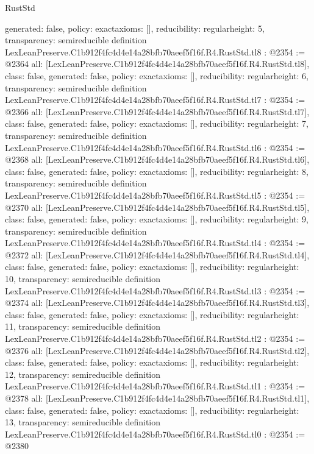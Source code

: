 \begin{lexlean}{RustStd}
\begin{coremodule}
{  generated: false,
  policy: exact{axioms: []},
  reducibility: regular{height: 5},
  transparency: semireducible
}
definition LexLeanPreserve.C1b912f4fc4d4e14a28bfb70aeef5f16f.R4.RustStd.tl8 : @2354 := @2364 {
  all: [LexLeanPreserve.C1b912f4fc4d4e14a28bfb70aeef5f16f.R4.RustStd.tl8],
  class: false,
  generated: false,
  policy: exact{axioms: []},
  reducibility: regular{height: 6},
  transparency: semireducible
}
definition LexLeanPreserve.C1b912f4fc4d4e14a28bfb70aeef5f16f.R4.RustStd.tl7 : @2354 := @2366 {
  all: [LexLeanPreserve.C1b912f4fc4d4e14a28bfb70aeef5f16f.R4.RustStd.tl7],
  class: false,
  generated: false,
  policy: exact{axioms: []},
  reducibility: regular{height: 7},
  transparency: semireducible
}
definition LexLeanPreserve.C1b912f4fc4d4e14a28bfb70aeef5f16f.R4.RustStd.tl6 : @2354 := @2368 {
  all: [LexLeanPreserve.C1b912f4fc4d4e14a28bfb70aeef5f16f.R4.RustStd.tl6],
  class: false,
  generated: false,
  policy: exact{axioms: []},
  reducibility: regular{height: 8},
  transparency: semireducible
}
definition LexLeanPreserve.C1b912f4fc4d4e14a28bfb70aeef5f16f.R4.RustStd.tl5 : @2354 := @2370 {
  all: [LexLeanPreserve.C1b912f4fc4d4e14a28bfb70aeef5f16f.R4.RustStd.tl5],
  class: false,
  generated: false,
  policy: exact{axioms: []},
  reducibility: regular{height: 9},
  transparency: semireducible
}
definition LexLeanPreserve.C1b912f4fc4d4e14a28bfb70aeef5f16f.R4.RustStd.tl4 : @2354 := @2372 {
  all: [LexLeanPreserve.C1b912f4fc4d4e14a28bfb70aeef5f16f.R4.RustStd.tl4],
  class: false,
  generated: false,
  policy: exact{axioms: []},
  reducibility: regular{height: 10},
  transparency: semireducible
}
definition LexLeanPreserve.C1b912f4fc4d4e14a28bfb70aeef5f16f.R4.RustStd.tl3 : @2354 := @2374 {
  all: [LexLeanPreserve.C1b912f4fc4d4e14a28bfb70aeef5f16f.R4.RustStd.tl3],
  class: false,
  generated: false,
  policy: exact{axioms: []},
  reducibility: regular{height: 11},
  transparency: semireducible
}
definition LexLeanPreserve.C1b912f4fc4d4e14a28bfb70aeef5f16f.R4.RustStd.tl2 : @2354 := @2376 {
  all: [LexLeanPreserve.C1b912f4fc4d4e14a28bfb70aeef5f16f.R4.RustStd.tl2],
  class: false,
  generated: false,
  policy: exact{axioms: []},
  reducibility: regular{height: 12},
  transparency: semireducible
}
definition LexLeanPreserve.C1b912f4fc4d4e14a28bfb70aeef5f16f.R4.RustStd.tl1 : @2354 := @2378 {
  all: [LexLeanPreserve.C1b912f4fc4d4e14a28bfb70aeef5f16f.R4.RustStd.tl1],
  class: false,
  generated: false,
  policy: exact{axioms: []},
  reducibility: regular{height: 13},
  transparency: semireducible
}
definition LexLeanPreserve.C1b912f4fc4d4e14a28bfb70aeef5f16f.R4.RustStd.tl0 : @2354 := @2380 {
}
\end{coremodule}
\end{lexlean}
